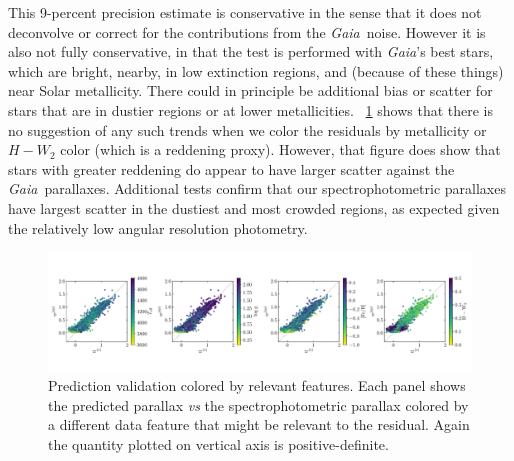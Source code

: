 \documentclass[modern]{aastex62}
\newcommand{\foreign}[1]{\textsl{#1}}
\newcommand{\project}[1]{\textsl{#1}}
\newcommand{\gaia}{\project{Gaia}}
\begin{document}
This 9-percent precision estimate is conservative in the sense that it does not
deconvolve or correct for the contributions from the \gaia\ noise.
However it is also not fully conservative, in that the test is performed with
\gaia's best stars, which are bright, nearby, in low extinction regions, and
(because of these things) near Solar metallicity.
There could in principle be additional bias or scatter for stars that are in dustier
regions or at lower metallicities.
\figurename~\ref{fig:residuals} shows that
there is no suggestion of any such trends when we color the residuals by metallicity
or $H-W_2$ color (which is a reddening proxy).
However, that figure does show that stars with greater reddening do appear to have
larger scatter against the \gaia\ parallaxes.
Additional tests confirm that our spectrophotometric parallaxes have largest scatter
in the dustiest and most crowded regions, as expected given the relatively low angular resolution
photometry.
\begin{figure}
\includegraphics[width=\textwidth]{./residuals_training.pdf}
\caption{Prediction validation colored by relevant features.
  Each panel shows the predicted parallax \foreign{vs} the
  spectrophotometric parallax colored by a different
  data feature that might be relevant to the residual.
  Again the quantity plotted on vertical axis is positive-definite.\label{fig:residuals}}
\end{figure}
\end{document}
